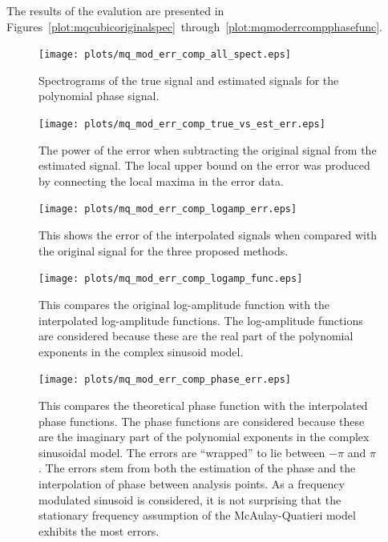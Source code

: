 The results of the evalution are presented in
Figures~\ref{plot:mqcubicoriginalspec}~through~\ref{plot:mqmoderrcompphasefunc}.


\begin{figure}[!t]
    \centering
    \texttt{[image: plots/mq\_mod\_err\_comp\_all\_spect.eps]}
    \caption{
        Spectrograms of the true signal and estimated signals for the polynomial
        phase signal.
    \label{plot:mqmoderrorallspect}}
\end{figure}

\begin{figure}[!t]
    \centering
    \texttt{[image: plots/mq\_mod\_err\_comp\_true\_vs\_est\_err.eps]}
    \caption{
        The power of the error when subtracting the original signal from the estimated
        signal. The local upper bound on the error was produced by connecting
        the local maxima in the error data.
    \label{plot:mqerrortruevsesterr}}
\end{figure}

\begin{figure}[!t]
    \centering
    \texttt{[image: plots/mq\_mod\_err\_comp\_logamp\_err.eps]}
    \caption{This shows the error of the interpolated signals when compared
    with the original signal for the three proposed methods.
    \label{plot:mqmoderrcomplogamperr}}
\end{figure}

\begin{figure}[!t]
    \centering
    \texttt{[image: plots/mq\_mod\_err\_comp\_logamp\_func.eps]}
    \caption{This compares the original log-amplitude function with the
    interpolated log-amplitude functions. The log-amplitude functions are
    considered because these are the real part of the polynomial exponents in
    the complex sinusoid model.
    \label{plot:mqmoderrcomplogampfunc}}
\end{figure}

\begin{figure}[!t]
    \centering
    \texttt{[image: plots/mq\_mod\_err\_comp\_phase\_err.eps]}
    \caption{This compares the theoretical phase function with the interpolated
        phase functions. The phase functions are considered because these are
        the imaginary part of the polynomial exponents in the complex sinusoidal
        model.  The errors are ``wrapped'' to lie between $-\pi$ and $\pi$. The
        errors stem from both the estimation of the phase and the interpolation
        of phase between analysis points. As a frequency modulated sinusoid is
        considered, it is not surprising that the stationary frequency
        assumption of the McAulay-Quatieri model exhibits the most errors.
    \label{plot:mqmoderrcompphaseerr}}
\end{figure}

